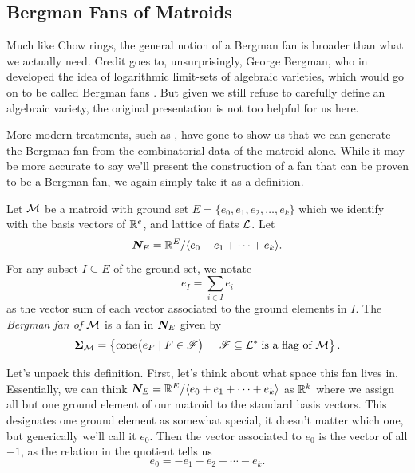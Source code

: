 \documentclass[12pt,oneside]{../../sfsuthesis}
\begin{document}
\subsection{Bergman Fans of Matroids}
Much like Chow rings, the general notion of a Bergman fan is broader than what we actually need.
Credit goes to, unsurprisingly, George Bergman, who in \cite{bergmanLogarithmicLimitsetAlgebraic1971} developed the idea of logarithmic limit-sets of algebraic varieties, which would go on to be called Bergman fans \cite{feichtnerMatroidPolytopesNested2005}.
But given we still refuse to carefully define an algebraic variety, the original presentation is not too helpful for us here.

More modern treatments, such as \cite{ardilaBergmanComplexMatroid2006,huhLogconcavityCharacteristicPolynomials2012}, have gone to show us that we can generate the Bergman fan from the combinatorial data of the matroid alone.
While it may be more accurate to say we'll present the construction of a fan that can be proven to be a Bergman fan, we again simply take it as a definition.

\begin{definition}\th\label{def:bergmanFan}
    Let \( \mathcal{M} \) be a matroid with ground set \( E = \{ e_0, e_1, e_2, \dots, e_k \} \) which we identify with the basis vectors of \( \mathbb{R}^e \), and lattice of flats \( \mathcal{L} \).
    Let
    \[
        \bm{N}_E = \mathbb{R}^{E}/\langle e_0 + e_1 + \cdots + e_k \rangle.
    \]
    For any subset \( I \subseteq E \) of the ground set, we notate
    \[
        e_I = \sum_{i \in I} e_i
    \]
    as the vector sum of each vector associated to the ground elements in \( I \).
    The \emph{Bergman fan of \( \mathcal{M} \)} is a fan in \( \bm{N}_E \) given by
    \[
        {\bm{\Sigma}}_{\mathcal{M}} = \left\{
        \mathrm{cone}\big( e_F \; | \; F \in \mathscr{F} \big)
        \;\; \middle| \;\;
        \mathscr{F} \subseteq \mathcal{L}^\ast \; \text{is a flag of \(\mathcal{M}\)}
        \right\}.
    \]
\end{definition}

Let's unpack this definition.
First, let's think about what space this fan lives in.
Essentially, we can think \( \bm{N}_E = \mathbb{R}^{E}/\langle e_0 + e_1 + \cdots + e_k \rangle \) as \( \mathbb{R}^k \) where we assign all but one ground element of our matroid to the standard basis vectors.
This designates one ground element as somewhat special, it doesn't matter which one, but generically we'll call it \( e_0 \).
Then the vector associated to \( e_0 \) is the vector of all \( -1 \), as the relation in the quotient tells us
\[
    e_0 = -e_1 - e_2 - \cdots - e_k.
\]
\end{document}
